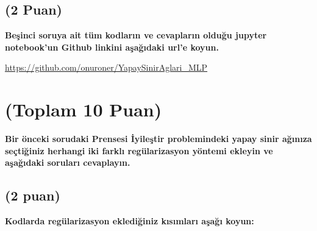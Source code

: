 \documentclass[11pt]{article}
\begin{document}
\subsection{(2 Puan)} \textbf{Beşinci soruya ait tüm kodların ve cevapların olduğu jupyter notebook'un Github linkini aşağıdaki url'e koyun.}

\url{https://github.com/onuroner/YapaySinirAglari_MLP}

\section{(Toplam 10 Puan)} \textbf{Bir önceki sorudaki Prensesi İyileştir problemindeki yapay sinir ağınıza seçtiğiniz herhangi iki farklı regülarizasyon yöntemi ekleyin ve aşağıdaki soruları cevaplayın.} 

\subsection{(2 puan)} \textbf{Kodlarda regülarizasyon eklediğiniz kısımları aşağı koyun:} 
\end{document}

